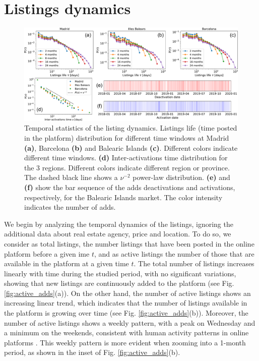 \section{Listings dynamics}

\begin{figure}
    \centering
    \includegraphics[width =\textwidth]{Figs/Idealista_dynamics/panel_time.pdf}
	\caption[Temporal statistics of the listing dynamics.]{ \label{fig:panel_time} Temporal statistics of the listing dynamics. Listings life (time posted in the platform) distribution for different time windows at Madrid \textbf{(a)}, Barcelona \textbf{(b)} and Balearic Islands \textbf{(c)}. Different colors indicate different time windows. \textbf{(d)} Inter-activations time distribution for the 3 regions. Different colors indicate different region or province. The dashed black line shows a $\nu^{-2}$ power-law distribution. \textbf{(e)} and \textbf{(f)} show the bar sequence of the adds deactivations and activations, respectively, for the Balearic Islands market. The color intensity indicates the number of adds.}
\end{figure}

We begin by analyzing the temporal dynamics of the listings, ignoring the additional data about real estate agency, price and location. To do so, we consider as total listings, the number listings that have been posted in the online platform before a given ime $t$, and as active listings the number of those that are available in the platform at a given time $t$. The total number of listings increases linearly with time during the studied period, with no significant variations, showing that new listings are continuously added to the platform (see Fig. \ref{fig:active_adds}(a)). On the other hand, the number of active listings shows an increasing linear trend, which indicates that the number of listings available in the platform is growing over time (see Fig. \ref{fig:active_adds}(b)). Moreover, the number of active listings shows a weekly pattern, with a peak on Wednesday and a minimum on the weekends, consistent with human activity patterns in online platforms \cite{goncalves-2008}. This weekly pattern is more evident when zooming into a 1-month period, as shown in the inset of Fig. \ref{fig:active_adds}(b).

